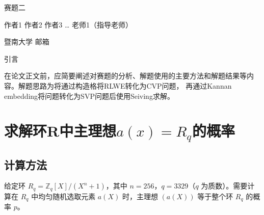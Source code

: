 \documentclass[12pt,a4paper]{article}
\newcommand{\fs}{\CJKfamily{fs}}
\numberwithin{equation}{section}
\begin{document}
\begin{center}
	{\heiti\fontsize{16pt}{24pt}\selectfont 赛题二}
\end{center}

\begin{center}
	{\fs\fontsize{12pt}{18pt}\selectfont 作者1 作者2 作者3 … 老师1（指导老师）}
\end{center}

\begin{center}
	{\songti\fontsize{10.5pt}{15.75pt}\selectfont 暨南大学 \; 邮箱}
\end{center}

\vspace{1em}


\vspace{1em}


\vspace{2em}

{\centering\heiti\fontsize{16pt}{24pt}\selectfont 引言\par}
\vspace{1em}

在论文正文前，应简要阐述对赛题的分析、解题使用的主要方法和解题结果等内容。解题思路为将通过构造格将RLWE转化为CVP问题，
再通过Kannan embedding将问题转化为SVP问题后使用Seiving求解。

\section{求解环R中主理想$a(x)=R_q$的概率}

\subsection{计算方法}

给定环 $R_q = \mathbb{Z}_q[X]/(X^n + 1)$，其中 $n = 256$，$q = 3329$（$q$ 为质数）。需要计算在 $R_q$ 中均匀随机选取元素 $a(X)$ 时，主理想 $(a(X))$ 等于整个环 $R_q$ 的概率 $p$。
\end{document}
